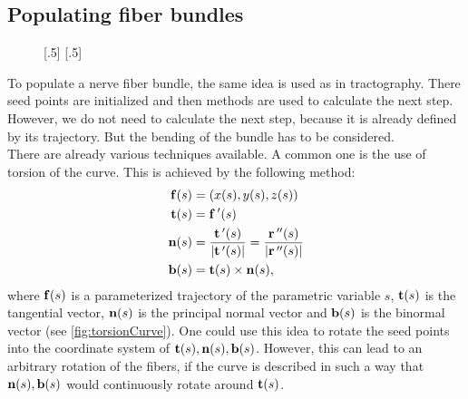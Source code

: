 \subsection{Populating fiber bundles}\label{sec:fillBundle}
% 
\begin{figure}[!t]
    \centering
    [.5\textwidth-4.3pt]{
    \setlength{\tikzwidth}{0.5\textwidth - 4.3pt}
    }\hfill
    [.5\textwidth-4.3pt]{
    }
	\caption{}
\end{figure}
% 
To populate a nerve fiber bundle, the same idea is used as in tractography.
There seed points are initialized and then \dummy{} methods are used to calculate the next step.
However, we do not need to calculate the next step, because it is already defined by its trajectory.
But the bending of the bundle has to be considered.
\\
% 
There are already various techniques available.
A common one is the use of torsion of the curve. This is achieved by the following method:
% 
\begin{align}
\begin{split}
\mathbf{f}(s) &= (x(s),y(s),z(s)) \\
\mathbf{t}(s) &= \mathbf{f}\,'(s) \\
\mathbf{n}(s) &= \frac{\mathbf{t}\,'(s)}{|\mathbf{t}\,'(s)|} = \frac{\mathbf{r}\,''(s)}{|\mathbf{r}\,''(s)|} \\
\mathbf{b}(s) &= \mathbf{t}(s) \times \mathbf{n}(s),
\end{split}
\end{align}
% 
where $\mathbf{f}(s)$ is a parameterized trajectory of the parametric variable $s$, $\mathbf{t}(s)$ is the tangential vector, $\mathbf{n}(s)$ is the principal normal vector and $\mathbf{b}(s)$ is the binormal vector (see \cref{fig:torsionCurve}).
One could use this idea to rotate the seed points into the coordinate system of $\mathbf{t}(s),\mathbf{n}(s),\mathbf{b}(s)$.
However, this can lead to an arbitrary rotation of the fibers, \eg{} if the curve is described in such a way that $\mathbf{n}(s),\mathbf{b}(s)$ would continuously rotate around $\mathbf{t}(s)$.
\\
